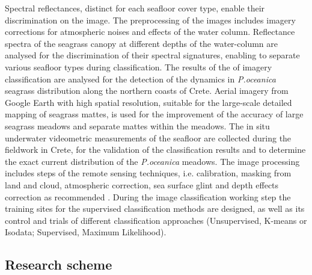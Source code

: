 \documentclass[10pt, a4paper]{article}
\begin{document}
Spectral reflectances, distinct for each seafloor cover type, enable their discrimination on the image. The preprocessing
of the images includes imagery corrections for atmospheric noises and effects of the water
column. Reflectance spectra of the seagrass canopy at different depths of the water-column are
analysed for the discrimination of their spectral signatures, enabling to separate various seafloor types
during classification. The results of the of imagery classification are analysed for the detection of the
dynamics in \textit{P.oceanica} seagrass distribution along the northern coasts of Crete. Aerial imagery from
Google Earth with high spatial resolution, suitable for the large-scale detailed mapping of seagrass
mattes, is used for the improvement of the accuracy of large seagrass meadows and separate mattes
within the meadows. The in situ underwater videometric measurements of the seafloor are collected
during the fieldwork in Crete, for the validation of the classification results and to determine the exact
current distribution of the \textit{P.oceanica} meadows. The image processing includes steps of the remote
sensing techniques, i.e. calibration, masking from land and cloud, atmospheric correction, sea surface
glint and depth effects correction as recommended \cite{Matarrese08}\label{Matarrese08}. During the image classification
working step the training sites for the supervised classification methods are designed, as well as its
control and trials of different classification approaches (Unsupervised, K-means or Isodata;
Supervised, Maximum Likelihood).

\subsection{Research scheme}
\end{document}
